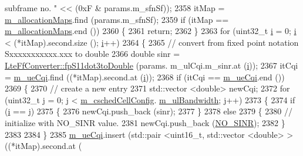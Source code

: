\begin{DoxyCode}
{       subframe no. "} << (0xF & params.m\_sfnSf));
2358         itMap = \hyperlink{classns3_1_1CqaFfMacScheduler_a3b02c0d7a89f3ed393066ba9bfda6210}{m\_allocationMaps}.find (params.m\_sfnSf);
2359         \textcolor{keywordflow}{if} (itMap == \hyperlink{classns3_1_1CqaFfMacScheduler_a3b02c0d7a89f3ed393066ba9bfda6210}{m\_allocationMaps}.end ())
2360           \{
2361             \textcolor{keywordflow}{return};
2362           \}
2363         \textcolor{keywordflow}{for} (uint32\_t \hyperlink{bernuolliDistribution_8m_a6f6ccfcf58b31cb6412107d9d5281426}{i} = 0; \hyperlink{bernuolliDistribution_8m_a6f6ccfcf58b31cb6412107d9d5281426}{i} < (*itMap).second.size (); \hyperlink{bernuolliDistribution_8m_a6f6ccfcf58b31cb6412107d9d5281426}{i}++)
2364           \{
2365             \textcolor{comment}{// convert from fixed point notation Sxxxxxxxxxxx.xxx to double}
2366             \textcolor{keywordtype}{double} sinr = \hyperlink{classns3_1_1LteFfConverter_aa5d8c2a8f988dbd63da91818c18666eb}{LteFfConverter::fpS11dot3toDouble} (params.
      m\_ulCqi.m\_sinr.at (\hyperlink{bernuolliDistribution_8m_a6f6ccfcf58b31cb6412107d9d5281426}{i}));
2367             itCqi = \hyperlink{classns3_1_1CqaFfMacScheduler_a263024e4342a26bfc2fabd0697da8641}{m\_ueCqi}.find ((*itMap).second.at (\hyperlink{bernuolliDistribution_8m_a6f6ccfcf58b31cb6412107d9d5281426}{i}));
2368             \textcolor{keywordflow}{if} (itCqi == \hyperlink{classns3_1_1CqaFfMacScheduler_a263024e4342a26bfc2fabd0697da8641}{m\_ueCqi}.end ())
2369               \{
2370                 \textcolor{comment}{// create a new entry}
2371                 std::vector <double> newCqi;
2372                 \textcolor{keywordflow}{for} (uint32\_t j = 0; j < \hyperlink{classns3_1_1CqaFfMacScheduler_ad5dc768ca3a3c71671fd64de7de8ec00}{m\_cschedCellConfig}.
      \hyperlink{structns3_1_1FfMacCschedSapProvider_1_1CschedCellConfigReqParameters_a5ab5b102878e6e7e7727a14af4a64d2f}{m\_ulBandwidth}; j++)
2373                   \{
2374                     \textcolor{keywordflow}{if} (\hyperlink{bernuolliDistribution_8m_a6f6ccfcf58b31cb6412107d9d5281426}{i} == j)
2375                       \{
2376                         newCqi.push\_back (sinr);
2377                       \}
2378                     \textcolor{keywordflow}{else}
2379                       \{
2380                         \textcolor{comment}{// initialize with NO\_SINR value.}
2381                         newCqi.push\_back (\hyperlink{cqa-ff-mac-scheduler_8h_a520d71777be043568160c783a9c65fd5}{NO\_SINR});
2382                       \}
2383 
2384                   \}
2385                 \hyperlink{classns3_1_1CqaFfMacScheduler_a263024e4342a26bfc2fabd0697da8641}{m\_ueCqi}.insert (std::pair <uint16\_t, std::vector <double> > ((*itMap).second.at (

\end{DoxyCode}
